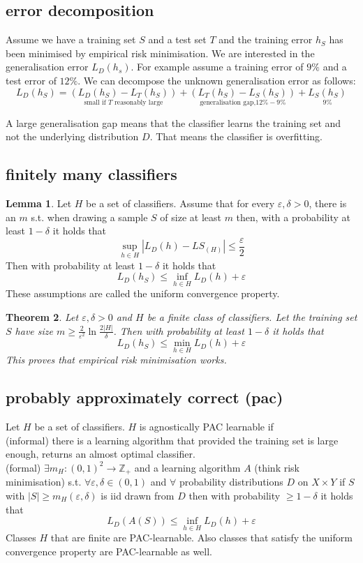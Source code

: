 \documentclass[a4paper, 12pt]{article}
\theoremstyle{plain}
\newtheorem{theorem}{Theorem}[subsection] %
\theoremstyle{definition}
\theoremstyle{lemma}
\newtheorem{lemma}[theorem]{Lemma}
\theoremstyle{remark}
\theoremstyle{example}
\begin{document}
	\subsection{error decomposition}
	Assume we have a training set $S$ and a test set $T$ and the training error $h_S$ has been minimised by empirical risk minimisation. We are interested in the generalisation error $L_D(h_s)$. For example assume a training error of $9\%$ and a test error of $12\%$. We can decompose the unknown generalisation error as follows: \[L_D(h_S) = \underset{\text{small if $T$ reasonably large}}{(L_D(h_S) - L_T(h_S))} + \underset{\text{generalisation gap,} 12\%-9\%}{(L_T(h_S)-L_S(h_S))} + \underset{9\%}{L_S(h_S)}\]
	
	A large generalisation gap means that the classifier learns the training set and not the underlying distribution $D$. That means the classifier is overfitting.
	\subsection{finitely many classifiers}
	\begin{lemma}
		Let $H$ be a set of classifiers. Assume that for every $\varepsilon, \delta > 0$, there is an $m$ s.t. when drawing a sample $S$ of size at least $m$ then, with a probability at least $1-\delta$ it holds that \[\sup_{h \in H} \left|L_D(h) - LS_(H)\right| \leq \frac{\varepsilon}{2}\] Then with probability at least $1-\delta$ it holds that \[L_D(h_S) \leq \inf_{h \in H}L_D(h)+\varepsilon\]
		These assumptions are called the uniform convergence property.
	\end{lemma}
	\begin{theorem}
		Let $\varepsilon, \delta > 0$ and $H$ be a finite class of classifiers. Let the training set $S$ have size $m\geq \frac{2}{\varepsilon^2}\ln\frac{2\left|H\right|}{\delta}$. Then with probability at least $1-\delta$ it holds that \[L_D(h_S) \leq \min_{h \in H} L_D(h) + \varepsilon\]
		This proves that empirical risk minimisation works.
	\end{theorem}
	\subsection{probably approximately correct (pac)}
	Let $H$ be a set of classifiers. $H$ is agnostically PAC learnable if\\
	(informal) there is a learning algorithm that provided the training set is large enough, returns an almost optimal classifier.\\
	(formal) $\exists m_H: (0,1)^2 \to \mathbb{Z}_+$ and a learning algorithm $A$ (think risk minimisation) s.t. $\forall \varepsilon,\delta \in (0,1)$ and $\forall$ probability distributions $D$ on $X\times Y$ if $S$ with $\left|S\right|\geq m_H(\varepsilon, \delta)$ is iid drawn from $D$ then with probability $\geq 1-\delta$ it holds that \[L_D(A(S)) \leq \inf_{h \in H}L_D(h)+\varepsilon\]
	Classes $H$ that are finite are PAC-learnable. Also classes that satisfy the uniform convergence property are PAC-learnable as well.
\end{document}
